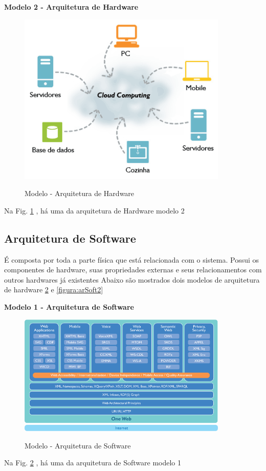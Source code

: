                 
                     \textbf{Modelo 2 - Arquitetura de Hardware }  
                
                
                  \begin{figure}[H]
                 \caption{Modelo - Arquitetura de Hardware}
               \centering %
                \includegraphics[width=10cm]{analisedeProjeto/arcloud} %
                \label{figura:arcloud}
                \end{figure}
                Na Fig. \ref{figura:arcloud} , há uma da arquitetura de Hardware modelo 2
                
                
                
                  \subsection{Arquitetura de Software}
  
 
É composta por toda a parte física que está relacionada com o sistema. Possui os componentes de hardware, suas propriedades externas e seus relacionamentos com outros hardwares já existentes
Abaixo são mostrados dois modelos de arquitetura de hardware   \ref{figura:arsoft} e \ref{figura:arSoft2}
  
   \textbf{Modelo 1 - Arquitetura de Software }
  
       \begin{figure}[H]
                 \caption{Modelo - Arquitetura de Software}
               \centering %
                \includegraphics[width=10cm]{analisedeProjeto/arsoft} %
                \label{figura:arsoft}
                \end{figure}
                Na Fig. \ref{figura:arsoft} , há uma da arquitetura de Software modelo 1
                
